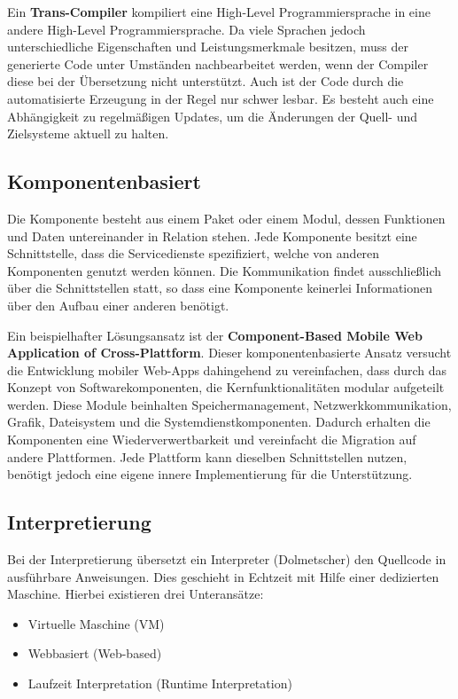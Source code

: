 \bigskip
Ein \textbf{Trans-Compiler} kompiliert eine High-Level Programmiersprache in eine andere High-Level Programmiersprache. Da viele Sprachen jedoch unterschiedliche Eigenschaften und Leistungsmerkmale besitzen, muss der generierte Code unter Umständen nachbearbeitet werden, wenn der Compiler diese bei der Übersetzung nicht unterstützt. Auch ist der Code durch die automatisierte Erzeugung in der Regel nur schwer lesbar. Es besteht auch eine Abhängigkeit zu regelmäßigen Updates, um die Änderungen der Quell- und Zielsysteme aktuell zu halten.

\subsection{Komponentenbasiert}
Die Komponente besteht aus einem Paket oder einem Modul, dessen Funktionen und Daten untereinander in Relation stehen. Jede Komponente besitzt eine Schnittstelle, dass die Servicedienste spezifiziert, welche von anderen Komponenten genutzt werden können. Die Kommunikation findet ausschließlich über die Schnittstellen statt, so dass eine Komponente keinerlei Informationen über den Aufbau einer anderen benötigt. 

\bigskip
Ein beispielhafter Lösungsansatz ist der \textbf{Component-Based Mobile Web Application of Cross-Plattform}. Dieser komponentenbasierte Ansatz versucht die Entwicklung mobiler Web-Apps dahingehend zu vereinfachen, dass durch das Konzept von Softwarekomponenten, die Kernfunktionalitäten modular aufgeteilt werden. Diese Module beinhalten Speichermanagement, Netzwerkkommunikation, Grafik, Dateisystem und die Systemdienstkomponenten. Dadurch erhalten die Komponenten eine Wiederverwertbarkeit und vereinfacht die Migration auf andere Plattformen. Jede Plattform kann dieselben Schnittstellen nutzen, benötigt jedoch eine eigene innere Implementierung für die Unterstützung. 

\subsection{Interpretierung}
Bei der Interpretierung übersetzt ein Interpreter (Dolmetscher) den Quellcode in ausführbare Anweisungen. Dies geschieht in Echtzeit mit Hilfe einer dedizierten Maschine. Hierbei existieren drei Unteransätze:

\begin{itemize}
	\item Virtuelle Maschine (VM)
	\item Webbasiert (Web-based)
	\item Laufzeit Interpretation (Runtime Interpretation)
\end{itemize}

